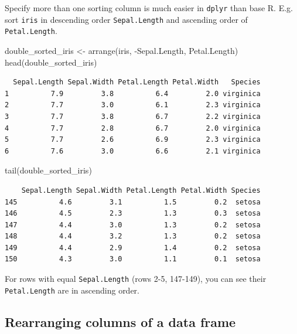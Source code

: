 \documentclass[
  letterpaper,
]{book}
\newenvironment{Shaded}{\begin{snugshade}}{\end{snugshade}}
\newcommand{\FunctionTok}[1]{\textcolor[rgb]{0.28,0.35,0.67}{#1}}
\newcommand{\NormalTok}[1]{\textcolor[rgb]{0.00,0.23,0.31}{#1}}
\newcommand{\OtherTok}[1]{\textcolor[rgb]{0.00,0.23,0.31}{#1}}
\newcommand{\SpecialCharTok}[1]{\textcolor[rgb]{0.37,0.37,0.37}{#1}}
\begin{document}
Specify more than one sorting column is much easier in \texttt{dplyr}
than base R. E.g. sort \texttt{iris} in descending order
\texttt{Sepal.Length} and ascending order of \texttt{Petal.Length}.

\begin{Shaded}
\begin{Highlighting}[]
\NormalTok{double\_sorted\_iris }\OtherTok{\textless{}{-}} \FunctionTok{arrange}\NormalTok{(iris, }\SpecialCharTok{{-}}\NormalTok{Sepal.Length, Petal.Length)}
\FunctionTok{head}\NormalTok{(double\_sorted\_iris)}
\end{Highlighting}
\end{Shaded}

\begin{verbatim}
  Sepal.Length Sepal.Width Petal.Length Petal.Width   Species
1          7.9         3.8          6.4         2.0 virginica
2          7.7         3.0          6.1         2.3 virginica
3          7.7         3.8          6.7         2.2 virginica
4          7.7         2.8          6.7         2.0 virginica
5          7.7         2.6          6.9         2.3 virginica
6          7.6         3.0          6.6         2.1 virginica
\end{verbatim}

\begin{Shaded}
\begin{Highlighting}[]
\FunctionTok{tail}\NormalTok{(double\_sorted\_iris)}
\end{Highlighting}
\end{Shaded}

\begin{verbatim}
    Sepal.Length Sepal.Width Petal.Length Petal.Width Species
145          4.6         3.1          1.5         0.2  setosa
146          4.5         2.3          1.3         0.3  setosa
147          4.4         3.0          1.3         0.2  setosa
148          4.4         3.2          1.3         0.2  setosa
149          4.4         2.9          1.4         0.2  setosa
150          4.3         3.0          1.1         0.1  setosa
\end{verbatim}

For rows with equal \texttt{Sepal.Length} (rows 2-5, 147-149), you can
see their \texttt{Petal.Length} are in ascending order.

\subsection{Rearranging columns of a data
frame}\label{rearranging-columns-of-a-data-frame}
\end{document}

